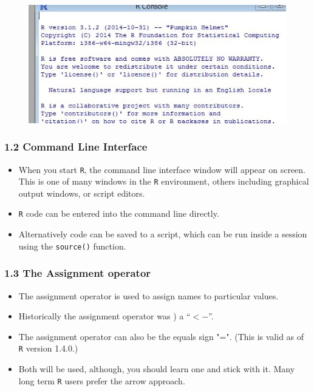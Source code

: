 \documentclass{beamer}
\begin{document}
 	
 	\begin{frame}
 		\begin{figure}
 			\centering
 			\includegraphics[width=1.2\linewidth]{images/Rversion}        
 		\end{figure}
 	\end{frame}  
 	\begin{frame}
 		
 		\frametitle{1.2 Command Line Interface}
 		\begin{itemize}
 			\item When you start \texttt{R}, the command line interface window will appear on screen. This is one
 			of many windows in the \texttt{R} environment, others including graphical output windows, or script
 			editors. 
 			\item \texttt{R} code can be entered into the command line directly. 
 			\item Alternatively code can be saved
 			to a script, which can be run inside a session using the \texttt{source()} function.
 		\end{itemize}
 	\end{frame}
 	\begin{frame}
 		\frametitle{1.3 The Assignment operator}
 		\begin{itemize}
 			\item The assignment operator is used to assign names to particular values. 
 			\item Historically the assignment
 			operator was ) a ``\texttt{$<-$}”. 
 			\item The assignment operator can also be the equals sign "=". (This is valid as of \texttt{R}
 			version 1.4.0.)
 			
 			\item Both will be used, although, you should learn one and stick with it. Many long term \texttt{R}
 			users prefer the arrow approach. 
 		\end{itemize}
 	\end{frame}
 	
\end{document}
